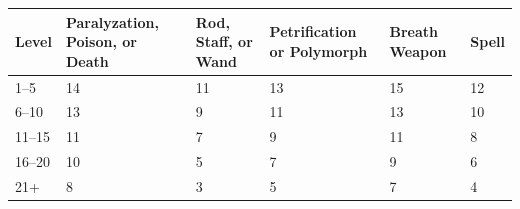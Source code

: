 
\noindent
\begin{minipage}{\columnwidth}

\label{wizardsaves}
\noindent
\begin{tabular}{|m{}|m{}|m{}|m{}|m{}|m{}|}
\hline
Level	& Paralyzation, Poison, or Death	& Rod, Staff, or Wand	& Petrification or Polymorph	& Breath Weapon	& Spell \\
\hline\hline
\rowcolor[gray]{.9}1--5		& 14	& 11	& 13	& 15	& 12 \\
6--10	& 13	& 9		& 11	& 13	& 10 \\
\rowcolor[gray]{.9}11--15	& 11	& 7		& 9		& 11	& 8 \\
16--20	& 10	& 5		& 7		& 9		& 6 \\
\rowcolor[gray]{.9}21+		& 8		& 3		& 5		& 7		& 4 \\
\hline
\end{tabular}

\end{minipage}

